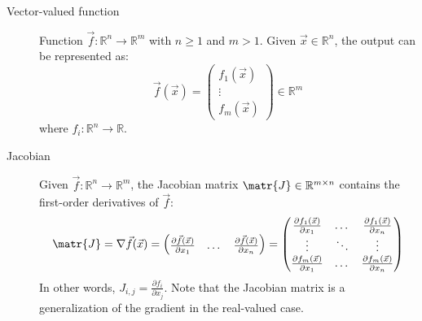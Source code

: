 \begin{description}
    \item[Vector-valued function]
        Function $\vec{f}: \mathbb{R}^n \rightarrow \mathbb{R}^m$ with $n \geq 1$ and $m > 1$.
        Given $\vec{x} \in \mathbb{R}^n$, the output can be represented as:
        \[
            \vec{f}(\vec{x}) = 
            \begin{pmatrix}
                f_1(\vec{x}) \\ \vdots \\ f_m(\vec{x})
            \end{pmatrix} \in \mathbb{R}^m
        \]
        where $f_i: \mathbb{R}^n \rightarrow \mathbb{R}$.

    \item[Jacobian] 
        Given $\vec{f}: \mathbb{R}^n \rightarrow \mathbb{R}^m$, the Jacobian matrix $\matr{J} \in \mathbb{R}^{m \times n}$
        contains the first-order derivatives of $\vec{f}$:
        \[
            \matr{J} = \nabla\vec{f}(\vec{x}) = 
            \begin{pmatrix}
                \frac{\partial \vec{f}(\vec{x})}{\partial x_1} & \dots & \frac{\partial \vec{f}(\vec{x})}{\partial x_n}
            \end{pmatrix} = 
            \begin{pmatrix}
                \frac{\partial f_1(\vec{x})}{\partial x_1} & \dots & \frac{\partial f_1(\vec{x})}{\partial x_n} \\
                \vdots & \ddots & \vdots \\
                \frac{\partial f_m(\vec{x})}{\partial x_1} & \dots & \frac{\partial f_m(\vec{x})}{\partial x_n} \\
            \end{pmatrix}
        \]
        In other words, $J_{i,j} = \frac{\partial f_i}{\partial x_j}$.
        Note that the Jacobian matrix is a generalization of the gradient in the real-valued case.
\end{description}